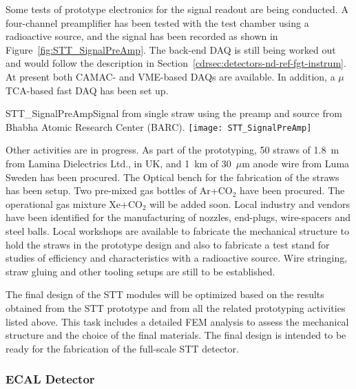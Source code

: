 Some tests of prototype electronics for the signal readout are being conducted. 
A four-channel preamplifier has been
tested with the test chamber using a radioactive source, and the signal
has been recorded as shown in Figure~\ref{fig:STT_SignalPreAmp}.  The
back-end DAQ is still being worked out and would follow the description 
in Section~\ref{cdrsec:detectors-nd-ref-fgt-instrum}. At
present both CAMAC- and VME-based DAQs are available. In addition, a $\mu$TCA-based fast
DAQ has been set up. 
\begin{cdrfigure}
{STT_SignalPreAmp}{Signal from single straw using the preamp and source from Bhabha Atomic Research Center (BARC).}
\texttt{[image: STT\_SignalPreAmp]}
\end{cdrfigure}

Other activities are in progress. As part of the prototyping, 50 straws of 1.8~m from Lamina
Dielectrics Ltd., in UK, and 1~km of 30~$\mu$m anode wire from Luma
Sweden has been procured. The Optical bench for the fabrication of the
straws has been setup.  Two pre-mixed gas bottles of Ar+CO$_2$ have been
procured. The operational gas mixture %
Xe+CO$_2$ will be added
soon. Local industry and vendors have been identified for the
manufacturing of nozzles, end-plugs, wire-spacers and steel
balls. Local workshops are available to fabricate the mechanical
structure to hold the straws in the prototype design and also to
fabricate a test stand for studies of efficiency and characteristics with
a radioactive source. Wire stringing, straw gluing and other tooling
setups are still to be established.


The final design of the STT modules will be optimized based on the
results obtained from the STT prototype and from all the related prototyping
activities listed above. This task includes a detailed FEM analysis to
assess the mechanical structure and the choice of the final
materials. The final design is intended to be ready for the
fabrication of the full-scale STT detector. 



\subsubsection{ECAL Detector}

